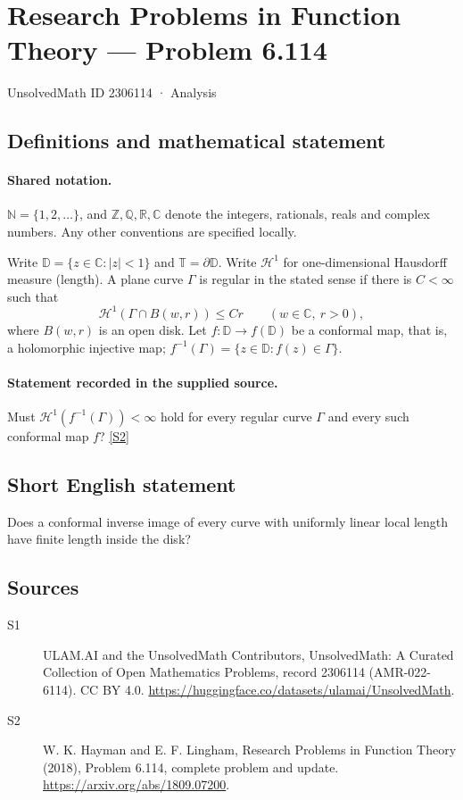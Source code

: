 \documentclass[11pt]{article}
\newcommand{\sref}[2]{\hyperlink{source:#1:#2}{[S#2]}}
\begin{document}
\setcounter{section}{2306113}
\section{Research Problems in Function Theory — Problem 6.114}\label{2306114}
{\small\sffamily UnsolvedMath ID 2306114 · Analysis}
\subsection{Definitions and mathematical statement}

\paragraph{Shared notation.}$\mathbb N=\{1,2,\ldots\}$, and $\mathbb Z,\mathbb Q,\mathbb R,\mathbb C$ denote the integers, rationals, reals and complex numbers. Any other conventions are specified locally.


Write $\mathbb D=\{z\in\mathbb C:|z|<1\}$ and $\mathbb T=\partial\mathbb D$. Write $\mathcal H^1$ for one-dimensional Hausdorff measure (length). A plane curve $\Gamma$ is regular in the stated sense if there is $C<\infty$ such that
\[\mathcal H^1(\Gamma\cap B(w,r))\leq Cr\qquad(w\in\mathbb C,\ r>0),\]
where $B(w,r)$ is an open disk. Let $f:\mathbb D\to f(\mathbb D)$ be a conformal map, that is, a holomorphic injective map; $f^{-1}(\Gamma)=\{z\in\mathbb D:f(z)\in\Gamma\}$.
\paragraph{Statement recorded in the supplied source.}
Must $\mathcal H^1(f^{-1}(\Gamma))<\infty$ hold for every regular curve $\Gamma$ and every such conformal map $f$? \sref{2306114}{2}
\subsection{Short English statement}
Does a conformal inverse image of every curve with uniformly linear local length have finite length inside the disk?
\subsection{Sources}
\begin{description}
\item[\hypertarget{source:2306114:1}{S1}] ULAM.AI and the UnsolvedMath Contributors, UnsolvedMath: A Curated Collection of Open Mathematics Problems, record 2306114 (AMR-022-6114). CC BY 4.0. \url{https://huggingface.co/datasets/ulamai/UnsolvedMath}.
\item[\hypertarget{source:2306114:2}{S2}] W. K. Hayman and E. F. Lingham, Research Problems in Function Theory (2018), Problem 6.114, complete problem and update. \url{https://arxiv.org/abs/1809.07200}.
\end{description}
\label{end:2306114}
\end{document}
